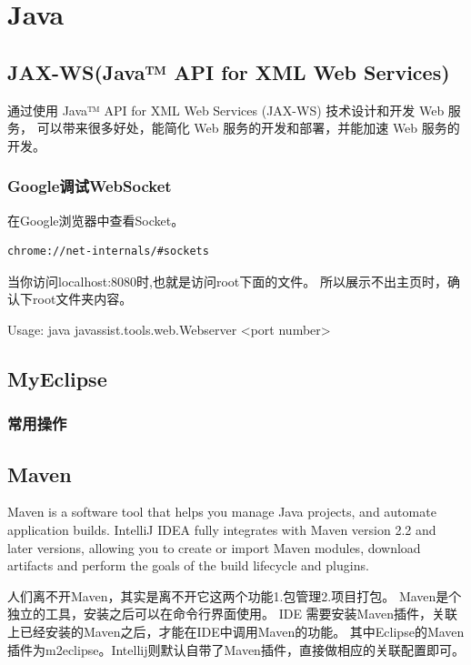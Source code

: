 \documentclass{book}
\begin{document}
\chapter{Java}

\section{JAX-WS(Java™ API for XML Web Services)}

通过使用 Java™ API for XML Web Services (JAX-WS) 技术设计和开发 Web 服务，
可以带来很多好处，能简化 Web 服务的开发和部署，并能加速 Web 服务的开发。

\subsection{Google调试WebSocket}

在Google浏览器中查看Socket。


\begin{lstlisting}[language=HTML]
chrome://net-internals/#sockets
\end{lstlisting}

当你访问localhost:8080时,也就是访问root下面的文件。
所以展示不出主页时，确认下root文件夹内容。

Usage: java javassist.tools.web.Webserver <port number>


\section{MyEclipse}

\subsection{常用操作}



\section{Maven}

Maven is a software tool that helps you manage Java projects, 
and automate application builds. IntelliJ IDEA fully integrates with Maven version 2.2 and later versions, 
allowing you to create or import Maven modules, download artifacts and perform the goals 
of the build lifecycle and plugins.

人们离不开Maven，其实是离不开它这两个功能1.包管理2.项目打包。
Maven是个独立的工具，安装之后可以在命令行界面使用。
IDE 需要安装Maven插件，关联上已经安装的Maven之后，才能在IDE中调用Maven的功能。
其中Eclipse的Maven插件为m2eclipse。Intellij则默认自带了Maven插件，直接做相应的关联配置即可。
\end{document}
